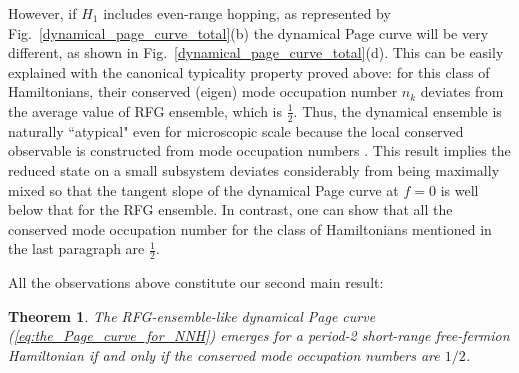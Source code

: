 \documentclass[twocolumn,english,prl,aps,superscriptaddress,amsmath,amssymb,floatfix]{revtex4-2}
\newtheorem{theorem}{Theorem}
\begin{document}
However, if $H_{1}$ includes even-range %
hopping, as represented by Fig.~\ref{dynamical_page_curve_total}(b) %
the dynamical Page curve will be very different, %
as shown in Fig.~\ref{dynamical_page_curve_total}(d).
This can be easily explained with the canonical typicality property
proved above: for this class of Hamiltonians, their conserved (eigen) mode
occupation number $n_{k}$ deviates from the average value of RFG ensemble,
which is %
$\frac{1}{2}$. %
Thus, %
the dynamical ensemble is naturally %
``atypical" even for microscopic scale because the local conserved observable is constructed from mode occupation numbers \citep{Ishii2019}. This result implies the reduced state on a small subsystem deviates considerably from being maximally mixed so that the tangent slope of the dynamical Page curve at $f=0$ is well below that for the RFG ensemble.
In contrast, one can show that all the conserved mode occupation number for the class of Hamiltonians mentioned in the last paragraph are $\frac{1}{2}$. 

All the observations above constitute our second main result: %
\begin{theorem}
The RFG-ensemble-like dynamical Page curve (\ref{eq:the_Page_curve_for_NNH}) emerges for a period-2 short-range free-fermion Hamiltonian if and only if the conserved mode occupation numbers are $1/2$. %
\end{theorem}


\end{document}
